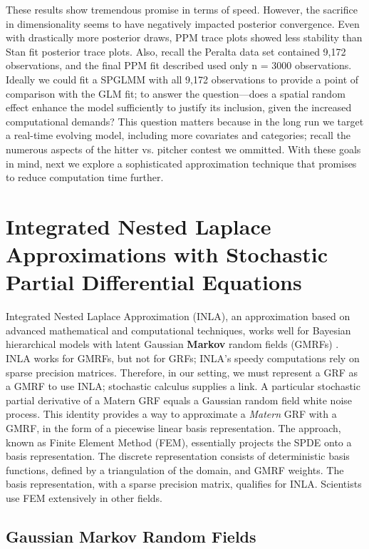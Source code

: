 These results show tremendous promise in terms of speed. However, the sacrifice in dimensionality seems to have negatively impacted posterior convergence. Even with drastically more posterior draws, PPM trace plots showed less stability than Stan
fit posterior trace plots. Also, recall the Peralta data set contained 9,172 observations, and the final PPM fit described used only n = 3000 observations. Ideally we could fit a SPGLMM with all 9,172 observations to provide a point of comparison with the GLM fit; to answer the question---does a spatial random effect enhance the model sufficiently to justify its inclusion, given the increased computational demands? This question matters because in the long run we target a real-time evolving model, including more covariates and categories; recall the numerous aspects of the hitter vs. pitcher contest we ommitted. With these goals in mind, next we explore a sophisticated approximation technique that promises to  reduce computation time further.

\section{Integrated Nested Laplace Approximations with Stochastic Partial Differential Equations} %
Integrated Nested Laplace Approximation (INLA), an approximation  based on advanced mathematical and computational techniques, works well for Bayesian hierarchical models with latent Gaussian {\bf Markov} random fields (GMRFs) \citep{Rue2007}. INLA works for GMRFs, but not for GRFs; INLA's speedy computations rely on sparse precision matrices. Therefore, in our setting, we must represent a GRF as a GMRF to use INLA; stochastic calculus supplies a link. A particular stochastic partial derivative of a Matern GRF equals a Gaussian random field white noise process. This identity provides a way to approximate a {\it Matern} GRF with a GMRF, in the form of a piecewise linear basis representation. The approach, known as Finite Element Method (FEM), essentially projects the SPDE onto a basis representation. The discrete representation consists of deterministic basis functions, defined by a triangulation of the domain, and GMRF weights. The basis representation, with a sparse precision matrix, qualifies for INLA. Scientists use FEM extensively in other fields.

\subsection{Gaussian Markov Random Fields}

